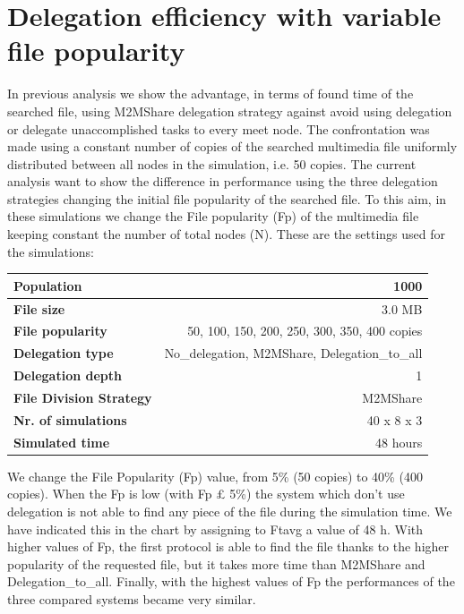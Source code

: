 \section{Delegation efficiency with variable file popularity}
In previous analysis we show the advantage, in terms of found time of the searched file, using M2MShare delegation strategy against avoid using delegation or delegate unaccomplished tasks to every meet node. The confrontation was made using a constant number of copies of the searched multimedia file uniformly distributed between all nodes in the simulation, i.e. 50 copies. The current analysis want to show the difference in performance using the three delegation strategies changing the initial file popularity of the searched file. To this aim, in these simulations we change the File popularity (Fp) of the multimedia file keeping constant the number of total nodes (N).
These are the settings used for the simulations:
\begin{table}[h]
\begin{center}
\begin{tabular}{|l|r|}
\hline
\bfseries Population & 1000 \\
\hline
\bfseries File size & 3.0 MB \\
\hline
\bfseries File popularity & 50, 100, 150, 200, 250, 300, 350, 400 copies \\
\hline
\bfseries Delegation type & No\_delegation, M2MShare, Delegation\_to\_all \\
\hline
\bfseries Delegation depth & 1 \\
\hline
\bfseries File Division Strategy & M2MShare \\
\hline
\bfseries Nr. of simulations & 40 x 8 x 3\\
\hline
\bfseries Simulated time & 48 hours \\
\hline
\end{tabular}
\end{center}
\end{table}
We change the File Popularity (Fp) value, from 5\% (50 copies) to 40\% (400 copies). When the Fp is low (with Fp £ 5\%) the system which don't use delegation is not able to find any piece of the file during the simulation time. We have indicated this in the chart by assigning to Ftavg a value of 48 h. With higher values of Fp, the first protocol is able to find the file thanks to the higher popularity of the requested file, but it takes more time than M2MShare and Delegation\_to\_all. Finally, with the highest values of Fp the performances of the three compared systems became very similar. 

